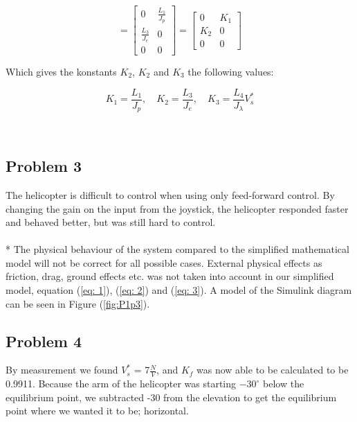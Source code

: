 \begin{equation}
    = \begin{bmatrix} 0 & \frac{L_1}{J_p} \\ \frac{L_3}{J_e} & 0 \\ 0 & 0 \end{bmatrix} = \begin{bmatrix} 0 & K_1 \\ K_2 & 0 \\ 0 & 0 \end{bmatrix}
\end{equation}

\newpage
Which gives the konstants $K_2$, $K_2$ and $K_3$ the following values:

\begin{center}
    \begin{equation} \label{eq: k1k2k3}
        K_1 = \frac{L_1}{J_p}, \quad K_2 = \frac{L_3}{J_e}, \quad K_3 = \frac{L_4}{J_\lambda} V_s^*  
    \end{equation}
\end{center}
\\
\subsection{Problem 3}
The helicopter is difficult to control when using only feed-forward control. By changing the gain on the input from the joystick, the helicopter responded faster and behaved better, but was still hard to control. \\
\\*
The physical behaviour of the system compared to the simplified mathematical model will not be correct for all possible cases. External physical effects as friction, drag, ground effects etc. was not taken into account in our simplified model, equation (\ref{eq: 1}), (\ref{eq: 2}) and (\ref{eq: 3}). A model of the Simulink diagram can be seen in Figure (\ref{fig:P1p3}).

\subsection{Problem 4}

By measurement we found $V^{*}_s$ = 7$\frac{N}{V}$, and $K_f$ was now able to be calculated to be 0.9911. 
Because the arm of the helicopter was starting $-30^{\circ}$ below the equilibrium point, we subtracted -30 from the elevation to get the equilibrium point where we wanted it to be;
horizontal. 


